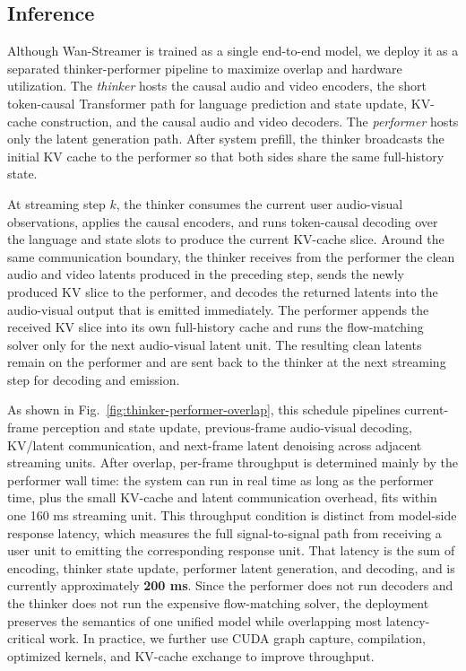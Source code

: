 \documentclass[]{style/style}
\begin{document}
\subsection{Inference}
\label{sec:inference}
Although Wan-Streamer is trained as a single end-to-end model, we deploy it as a separated thinker-performer pipeline to maximize overlap and hardware utilization. The \textit{thinker} hosts the causal audio and video encoders, the short token-causal Transformer path for language prediction and state update, KV-cache construction, and the causal audio and video decoders. The \textit{performer} hosts only the latent generation path. After system prefill, the thinker broadcasts the initial KV cache to the performer so that both sides share the same full-history state.

At streaming step $k$, the thinker consumes the current user audio-visual observations, applies the causal encoders, and runs token-causal decoding over the language and state slots to produce the current KV-cache slice. Around the same communication boundary, the thinker receives from the performer the clean audio and video latents produced in the preceding step, sends the newly produced KV slice to the performer, and decodes the returned latents into the audio-visual output that is emitted immediately. The performer appends the received KV slice into its own full-history cache and runs the flow-matching solver only for the next audio-visual latent unit. The resulting clean latents remain on the performer and are sent back to the thinker at the next streaming step for decoding and emission.

As shown in Fig.~\ref{fig:thinker-performer-overlap}, this schedule pipelines current-frame perception and state update, previous-frame audio-visual decoding, KV/latent communication, and next-frame latent denoising across adjacent streaming units. After overlap, per-frame throughput is determined mainly by the performer wall time: the system can run in real time as long as the performer time, plus the small KV-cache and latent communication overhead, fits within one 160 ms streaming unit. This throughput condition is distinct from model-side response latency, which measures the full signal-to-signal path from receiving a user unit to emitting the corresponding response unit. That latency is the sum of encoding, thinker state update, performer latent generation, and decoding, and is currently approximately \textbf{200 ms}. Since the performer does not run decoders and the thinker does not run the expensive flow-matching solver, the deployment preserves the semantics of one unified model while overlapping most latency-critical work. In practice, we further use CUDA graph capture, compilation, optimized kernels, and KV-cache exchange to improve throughput.
\end{document}
